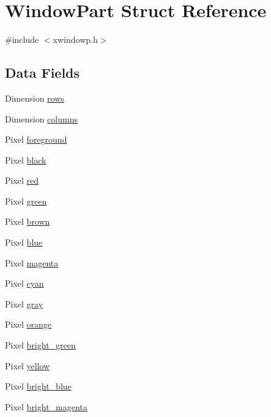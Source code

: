 \hypertarget{structWindowPart}{\section{Window\+Part Struct Reference}
\label{structWindowPart}
}


{\ttfamily \#include $<$xwindowp.\+h$>$}

\subsection*{Data Fields}
\begin{DoxyCompactItemize}
\item 
Dimension \hyperlink{structWindowPart_a4663a7f4178ce04f165cce9495bc7b82}{rows}
\item 
Dimension \hyperlink{structWindowPart_a84cba698ad83d05300c32768817f0afc}{columns}
\item 
Pixel \hyperlink{structWindowPart_a73d40b151072677a7815695fe3699907}{foreground}
\item 
Pixel \hyperlink{structWindowPart_a8cd1216d558aee91873212dfd1fe8dcb}{black}
\item 
Pixel \hyperlink{structWindowPart_a06fb532b433d74cbb1a57e7a5ce667b4}{red}
\item 
Pixel \hyperlink{structWindowPart_af654accb46ccf3d4d6af30c6b6f2741d}{green}
\item 
Pixel \hyperlink{structWindowPart_a97c07c322b095a2fb4e6d857bd1134d4}{brown}
\item 
Pixel \hyperlink{structWindowPart_a29cada8a26ea125799f501be4371bdca}{blue}
\item 
Pixel \hyperlink{structWindowPart_ab156f6994a064eb0bb2732f925c85e1f}{magenta}
\item 
Pixel \hyperlink{structWindowPart_a19b4039208c46af3a7a9a8460bd8236f}{cyan}
\item 
Pixel \hyperlink{structWindowPart_a2f2673c38a69c2359f0be2c025d80ceb}{gray}
\item 
Pixel \hyperlink{structWindowPart_a3544eaf79902d2f60d6a813efc8cca30}{orange}
\item 
Pixel \hyperlink{structWindowPart_ad9f52ea1c1ec13b6fa0313dc75debf95}{bright\+\_\+green}
\item 
Pixel \hyperlink{structWindowPart_a581e30a1cf0fca459d1faf6166e3f837}{yellow}
\item 
Pixel \hyperlink{structWindowPart_a84bcfe34f7e5c0b2f2e4f395cd72b9b7}{bright\+\_\+blue}
\item 
Pixel \hyperlink{structWindowPart_a547ade03ce493bb130c6b25ccd169aaa}{bright\+\_\+magenta}

\end{DoxyCompactItemize}
